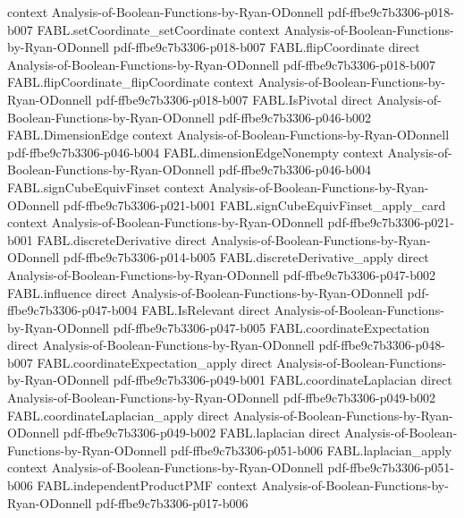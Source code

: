 \begin{theorem}
  {context}
  {Analysis-of-Boolean-Functions-by-Ryan-ODonnell}
  {pdf-ffbe9c7b3306-p018-b007}
\proofstep
  {FABL.setCoordinate_setCoordinate}
  {context}
  {Analysis-of-Boolean-Functions-by-Ryan-ODonnell}
  {pdf-ffbe9c7b3306-p018-b007}
\proofstep
  {FABL.flipCoordinate}
  {direct}
  {Analysis-of-Boolean-Functions-by-Ryan-ODonnell}
  {pdf-ffbe9c7b3306-p018-b007}
\proofstep
  {FABL.flipCoordinate_flipCoordinate}
  {context}
  {Analysis-of-Boolean-Functions-by-Ryan-ODonnell}
  {pdf-ffbe9c7b3306-p018-b007}
\proofstep
  {FABL.IsPivotal}
  {direct}
  {Analysis-of-Boolean-Functions-by-Ryan-ODonnell}
  {pdf-ffbe9c7b3306-p046-b002}
\proofstep
  {FABL.DimensionEdge}
  {context}
  {Analysis-of-Boolean-Functions-by-Ryan-ODonnell}
  {pdf-ffbe9c7b3306-p046-b004}
\proofstep
  {FABL.dimensionEdgeNonempty}
  {context}
  {Analysis-of-Boolean-Functions-by-Ryan-ODonnell}
  {pdf-ffbe9c7b3306-p046-b004}
\proofstep
  {FABL.signCubeEquivFinset}
  {context}
  {Analysis-of-Boolean-Functions-by-Ryan-ODonnell}
  {pdf-ffbe9c7b3306-p021-b001}
\proofstep
  {FABL.signCubeEquivFinset_apply_card}
  {context}
  {Analysis-of-Boolean-Functions-by-Ryan-ODonnell}
  {pdf-ffbe9c7b3306-p021-b001}
\proofstep
  {FABL.discreteDerivative}
  {direct}
  {Analysis-of-Boolean-Functions-by-Ryan-ODonnell}
  {pdf-ffbe9c7b3306-p014-b005}
\proofstep
  {FABL.discreteDerivative_apply}
  {direct}
  {Analysis-of-Boolean-Functions-by-Ryan-ODonnell}
  {pdf-ffbe9c7b3306-p047-b002}
\proofstep
  {FABL.influence}
  {direct}
  {Analysis-of-Boolean-Functions-by-Ryan-ODonnell}
  {pdf-ffbe9c7b3306-p047-b004}
\proofstep
  {FABL.IsRelevant}
  {direct}
  {Analysis-of-Boolean-Functions-by-Ryan-ODonnell}
  {pdf-ffbe9c7b3306-p047-b005}
\proofstep
  {FABL.coordinateExpectation}
  {direct}
  {Analysis-of-Boolean-Functions-by-Ryan-ODonnell}
  {pdf-ffbe9c7b3306-p048-b007}
\proofstep
  {FABL.coordinateExpectation_apply}
  {direct}
  {Analysis-of-Boolean-Functions-by-Ryan-ODonnell}
  {pdf-ffbe9c7b3306-p049-b001}
\proofstep
  {FABL.coordinateLaplacian}
  {direct}
  {Analysis-of-Boolean-Functions-by-Ryan-ODonnell}
  {pdf-ffbe9c7b3306-p049-b002}
\proofstep
  {FABL.coordinateLaplacian_apply}
  {direct}
  {Analysis-of-Boolean-Functions-by-Ryan-ODonnell}
  {pdf-ffbe9c7b3306-p049-b002}
\proofstep
  {FABL.laplacian}
  {direct}
  {Analysis-of-Boolean-Functions-by-Ryan-ODonnell}
  {pdf-ffbe9c7b3306-p051-b006}
\proofstep
  {FABL.laplacian_apply}
  {context}
  {Analysis-of-Boolean-Functions-by-Ryan-ODonnell}
  {pdf-ffbe9c7b3306-p051-b006}
\proofstep
  {FABL.independentProductPMF}
  {context}
  {Analysis-of-Boolean-Functions-by-Ryan-ODonnell}
  {pdf-ffbe9c7b3306-p017-b006}

\end{theorem}

